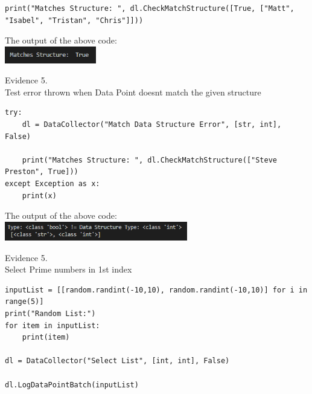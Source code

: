 \begin{flushleft}
\begin{center}
\begin{verbatim}
print("Matches Structure: ", dl.CheckMatchStructure([True, ["Matt", "Isabel", "Tristan", "Chris"]]))
        \end{verbatim}
                        
        The output of the above code: \\
        \includegraphics[width=4cm]{Images/Testing/T4.5.1.PNG} \\
        \vspace{1cm}

        {\large Evidence 5.\rn } \\ 
        \vspace{0.3cm}
        Test error thrown when Data Point doesnt match the given structure \\

        \begin{verbatim}
try:
    dl = DataCollector("Match Data Structure Error", [str, int], False)

    print("Matches Structure: ", dl.CheckMatchStructure(["Steve Preston", True]))
except Exception as x:
    print(x)
        \end{verbatim}

        The output of the above code: \\
        \includegraphics[width=8cm]{Images/Testing/T4.6.1.PNG} \\
        \vspace{1cm}

        {\large Evidence 5.\rn } \\ 
        \vspace{0.3cm}
        Select Prime numbers in 1st index\\

        \begin{verbatim}
inputList = [[random.randint(-10,10), random.randint(-10,10)] for i in range(5)]
print("Random List:")
for item in inputList:
    print(item)

dl = DataCollector("Select List", [int, int], False)

dl.LogDataPointBatch(inputList)


\end{verbatim}
\end{center}
\end{flushleft}
